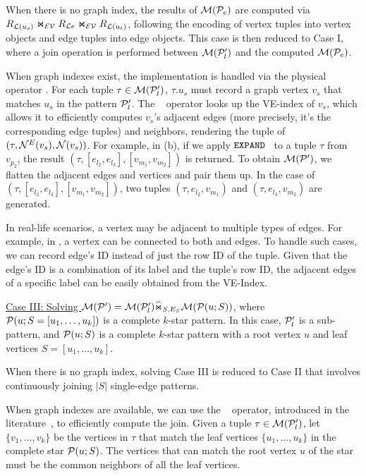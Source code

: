 When there is no graph index, the results of $\mathcal{M}(\mathcal{P}_e)$ are computed via $R_{\mathcal{L}(u_s)} \Join_\mathcal{EV} R_{\mathcal{L}{e}} \Join_\mathcal{EV} R_{\mathcal{L}(u_t)}$, following the encoding of vertex tuples into vertex objects and edge tuples into edge objects.
This case is then reduced to Case I, where a join operation is performed between $\mathcal{M}(\mathcal{P}'_l)$ and the computed $\mathcal{M}(\mathcal{P}_e)$.

When graph indexes exist, the implementation is handled via the physical operator . For each tuple $\tau \in \mathcal{M}(\mathcal{P}'_l)$, $\tau.u_s$ must record a graph vertex $v_s$ that matches $u_s$ in the pattern $\mathcal{P}'_l$. The \expand~ operator looks up the VE-index of $v_s$, which allows it to efficiently computes $v_s$'s adjacent edges (more precisely, it's the corresponding edge tuples) and neighbors, rendering the tuple of $(\tau, {\mathcal{N}}^E(v_s), {\mathcal{N}}(v_s))$. For example, in (b), if we apply ${\texttt{EXPAND}}$~ to a tuple $\tau$ from $v_{p_2}$, the result $(\tau, [e_{l_2}, e_{l_3}], [v_{m_1}, v_{m_2}])$ is returned.
To obtain $\mathcal{M}(\mathcal{P}')$, we flatten the adjacent edges and vertices and pair them up. In the case of $(\tau, [e_{l_2}, e_{l_3}], [v_{m_1}, v_{m_2}])$, two tuples $(\tau, e_{l_2}, v_{m_1})$ and $(\tau, e_{l_3}, v_{m_2})$ are generated.


In real-life scenarios, a vertex may be adjacent to multiple types of edges. For example, in , a  vertex can be connected to both  and  edges. To handle such cases, we can record edge's ID instead of just the row ID of the tuple. Given that the edge's ID is a combination of its label and the tuple's row ID, the adjacent edges of a specific label can be easily obtained from the VE-Index.

\underline{Case III: Solving $\mathcal{M}(\mathcal{P}') = \mathcal{M}(\mathcal{P}'_l) \widehat{\Join}_{S, E_S} \mathcal{M}(\mathcal{P}(u;S))$}, where $\mathcal{P}(u;S = [u_1, \ldots, u_k])$ is a complete $k$-star pattern. In this case, $\mathcal{P}'_l$ is a sub-pattern, and $\mathcal{P}(u;S)$ is a complete $k$-star pattern with a root vertex $u$ and leaf vertices $S = [u_1, \ldots, u_k]$.

When there is no graph index, solving Case III is reduced to Case II that involves continuously joining $|S|$ single-edge patterns.

When graph indexes are available, we can use the \expandintersect~ operator, introduced in the literature~\cite{huge,GLogS,mhedhbi2019optimizing}, to efficiently compute the join. Given a tuple $\tau \in \mathcal{M}(\mathcal{P}'_l)$, let $\{v_1, \ldots, v_k\}$ be the vertices in $\tau$ that match the leaf vertices $\{u_1, \ldots, u_k\}$ in the complete star $\mathcal{P}(u;S)$. The vertices that can match the root vertex $u$ of the star must be the common neighbors of all the leaf vertices.

